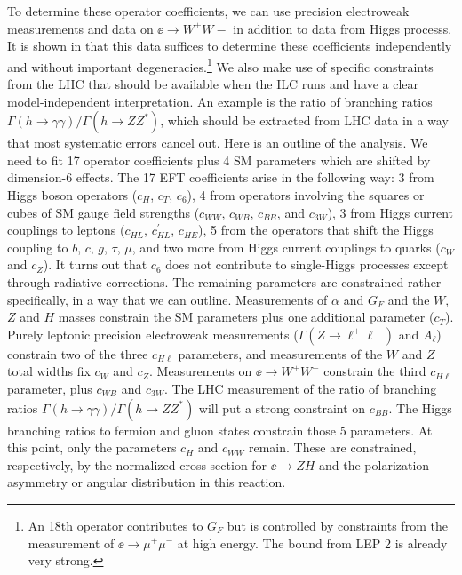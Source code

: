 To determine
 these operator coefficients, we can use precision electroweak measurements and
 data on $\ee\to W^+W-$ in addition to data 
from Higgs processs.
   It is shown in 
\cite{Barklow:2017suo,Barklow:2017awn} that this data suffices to determine these
coefficients independently and without important 
degeneracies.\footnote{An 18th operator contributes to $G_F$
  but is controlled by constraints from the measurement of  $\ee\to
  \mu^+\mu^-$ at high energy.  The bound from LEP 2 is already very
  strong.}     We also make use of specific constraints from the LHC
that should be available when the ILC runs and have a clear
model-independent interpretation.  An example is the  ratio of
branching ratios   $\Gamma(h\to \gamma\gamma)/\Gamma(h\to ZZ^*)$,
which 
should be extracted  from LHC data in
a way that most systematic errors cancel out.
Here is an outline of the analysis. We need to fit 17 operator
coefficients plus 4 SM parameters which are shifted by dimension-6
effects.  The 17
EFT coefficients arise in the following way:  3 from Higgs boson
operators ($c_H$, $c_T$, $c_6$), 4 from operators involving the
squares or cubes of SM gauge field strengths ($c_{WW}$, $c_{WB}$,
$c_{BB}$, and $c_{3W}$), 3 from Higgs current couplings to leptons
($c_{HL}$, $c_{HL}^\prime$, $c_{HE}$), 5 from the operators that shift
the Higgs coupling to $b$, $c$, $g$, $\tau$, $\mu$, and two more from
Higgs current couplings to quarks ($c_{W}$ and $c_Z$).   It turns out
that $c_6$ does not contribute to single-Higgs processes except
through radiative corrections.  The remaining parameters are
constrained rather specifically, in a way that we can outline.  Measurements of
$\alpha$ and 
$G_F$ and the $W$, $Z$ and $H$ masses constrain the SM parameters plus
one additional parameter ($c_T$).  Purely leptonic precision electroweak 
measurements ($\Gamma(Z\to \ell^+\ell^-)$ and $A_{\ell}$) constrain
two of the three $c_{H\ell}$ parameters, and measurements of the $W$
and $Z$ total widths fix $c_W$ and $c_Z$.   Measurements on $\ee\to
W^+W^-$ constrain  the third $c_{H\ell}$  parameter, plus $c_{WB}$ and
$c_{3W}$.    The LHC measurement of the ratio of branching ratios 
$\Gamma(h\to \gamma\gamma)/\Gamma(h\to ZZ^*)$ will put a strong
constraint on $c_{BB}$.   The Higgs branching ratios to fermion and
gluon states constrain those 5 parameters.  At this point, only the
parameters $c_H$ and $c_{WW}$ remain.  These are constrained, respectively, by the
normalized cross section for $\ee\to ZH$ and the polarization
asymmetry or angular distribution in this reaction.  

